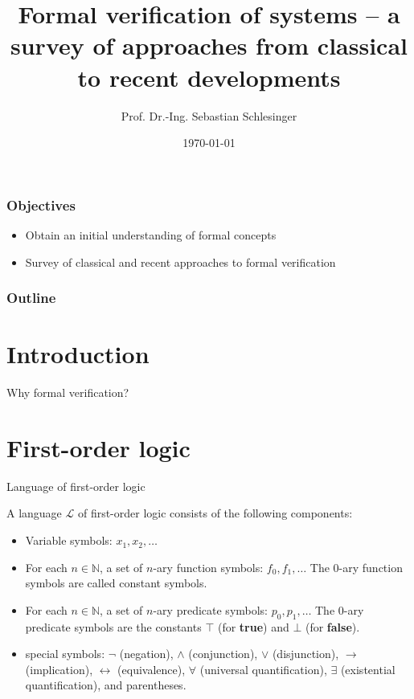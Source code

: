 \documentclass{beamer}
\title[Formal Verification]{Formal verification of systems -- a survey of approaches from classical to recent developments}
\author[Sebastian Schlesinger]{Prof. Dr.-Ing. Sebastian Schlesinger}
\institute[HWR Berlin]{Berlin School for Economics and Law}
\date{\today}
\begin{document}
 \begin{frame}
\titlepage
\end{frame}
\begin{frame}
\frametitle{Objectives}
\begin{itemize}
\item Obtain an initial understanding of formal concepts
\item Survey of classical and recent approaches to formal verification
 
\end{itemize}

\end{frame}
\begin{frame}
  \frametitle{Outline}
  \tableofcontents
\end{frame}

\section{Introduction}
\begin{frame}{Why formal verification?}
  
\end{frame}

\section{First-order logic}
\begin{frame}{Language of first-order logic}
  
    A language $\mathscr{L}$ of first-order logic consists of the following components:
    \begin{itemize}
    \item Variable symbols: $x_1, x_2, \ldots$
    \item For each $n\in\mathbb{N}$, a set of $n$-ary function symbols: $f_0, f_1, \ldots$ The 0-ary function symbols are called constant symbols.
    \item For each $n\in\mathbb{N}$, a set of $n$-ary predicate symbols: $p_0, p_1, \ldots$ The 0-ary predicate symbols are the constants $\top$ (for \textbf{true}) and $\bot$ (for \textbf{false}).
    \item special symbols: $\neg$ (negation), $\wedge$ (conjunction), $\vee$ (disjunction), $\rightarrow$ (implication), $\leftrightarrow$ (equivalence), $\forall$ (universal quantification), $\exists$ (existential quantification), and parentheses.
  \end{itemize}

  \end{frame}
\end{document}
